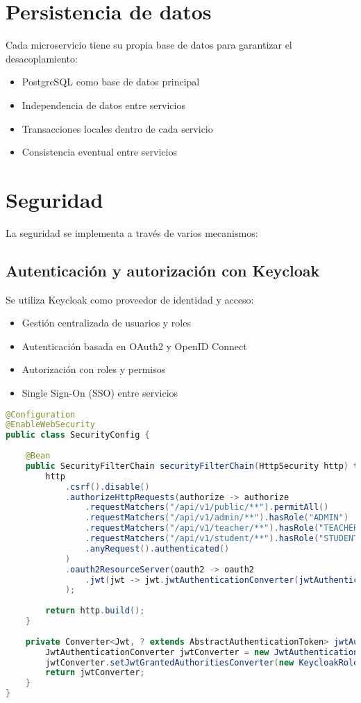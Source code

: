\documentclass[12pt,a4paper]{report}
\begin{document}
\section{Persistencia de datos}
Cada microservicio tiene su propia base de datos para garantizar el desacoplamiento:

\begin{itemize}
    \item PostgreSQL como base de datos principal
    \item Independencia de datos entre servicios
    \item Transacciones locales dentro de cada servicio
    \item Consistencia eventual entre servicios
\end{itemize}

\section{Seguridad}
La seguridad se implementa a través de varios mecanismos:

\subsection{Autenticación y autorización con Keycloak}
Se utiliza Keycloak como proveedor de identidad y acceso:

\begin{itemize}
    \item Gestión centralizada de usuarios y roles
    \item Autenticación basada en OAuth2 y OpenID Connect
    \item Autorización con roles y permisos
    \item Single Sign-On (SSO) entre servicios
\end{itemize}

\begin{lstlisting}[language=Java, caption=Configuración de seguridad con Keycloak]
@Configuration
@EnableWebSecurity
public class SecurityConfig {
    
    @Bean
    public SecurityFilterChain securityFilterChain(HttpSecurity http) throws Exception {
        http
            .csrf().disable()
            .authorizeHttpRequests(authorize -> authorize
                .requestMatchers("/api/v1/public/**").permitAll()
                .requestMatchers("/api/v1/admin/**").hasRole("ADMIN")
                .requestMatchers("/api/v1/teacher/**").hasRole("TEACHER")
                .requestMatchers("/api/v1/student/**").hasRole("STUDENT")
                .anyRequest().authenticated()
            )
            .oauth2ResourceServer(oauth2 -> oauth2
                .jwt(jwt -> jwt.jwtAuthenticationConverter(jwtAuthenticationConverter()))
            );
        
        return http.build();
    }
    
    private Converter<Jwt, ? extends AbstractAuthenticationToken> jwtAuthenticationConverter() {
        JwtAuthenticationConverter jwtConverter = new JwtAuthenticationConverter();
        jwtConverter.setJwtGrantedAuthoritiesConverter(new KeycloakRoleConverter());
        return jwtConverter;
    }
}
\end{lstlisting}
\end{document}
